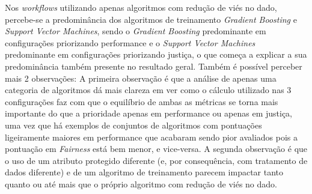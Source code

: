\documentclass[portugues]{ic-tese}
\begin{document}
Nos \textit{workflows} utilizando apenas algoritmos com redução de viés no dado, percebe-se a predominância dos algoritmos de treinamento \textit{Gradient Boosting} e \textit{Support Vector Machines}, sendo o \textit{Gradient Boosting} predominante em configurações priorizando performance e o \textit{Support Vector Machines} predominante em configurações priorizando justiça, o que começa a explicar a sua predominância também presente no resultado geral. Também é possível perceber mais 2 observações: A primeira observação é que a análise de apenas uma categoria de algoritmos dá mais clareza em ver como o cálculo utilizado nas 3 configurações faz com que o equilíbrio de ambas as métricas se torna mais importante do que a prioridade apenas em performance ou apenas em justiça, uma vez que há exemplos de conjuntos de algoritmos com pontuações ligeiramente maiores em performance que acabaram sendo pior avaliados pois a pontuação em \textit{Fairness} está bem menor, e vice-versa. A segunda observação é que o uso de um atributo protegido diferente (e, por consequência, com tratamento de dados diferente) e de um algoritmo de treinamento parecem impactar tanto quanto ou até mais que o próprio algoritmo com redução de viés no dado.

\begin{table}[H]
\begin{center}
  \caption{Melhores opções escolhidas pelo modelo MAPE-K \\ Apenas com redução de viés no treinamento - 50\% Performance/50\% Fairness}
\label{tbl:ScoreMAPEKInproc5050}
\end{center}
\end{table}
\end{document}
